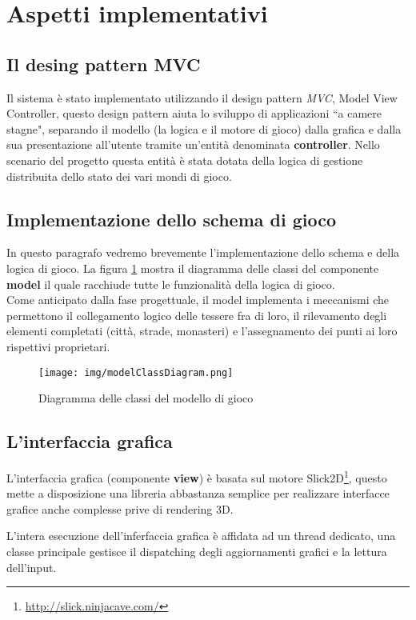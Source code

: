 \section{Aspetti implementativi}



\subsection{Il desing pattern MVC}
Il sistema \`e stato implementato utilizzando il design pattern \emph{MVC},
Model View Controller, questo design pattern aiuta lo sviluppo di applicazioni
``a camere stagne", separando il modello (la logica e il motore di gioco) dalla
grafica e dalla sua presentazione all'utente tramite un'entit\`a denominata
\textbf{controller}. Nello scenario del progetto questa entit\`a \`e stata
dotata della logica di gestione distribuita dello stato dei vari mondi di gioco.

\subsection{Implementazione dello schema di gioco}


In questo paragrafo vedremo brevemente l'implementazione dello schema e
della logica di gioco.
La figura \ref{img:model} mostra il diagramma delle classi del
componente \textbf{model} il quale racchiude tutte le funzionalità della logica
di gioco.\\
Come anticipato dalla fase progettuale, il model implementa i meccanismi che permettono
il collegamento logico delle tessere fra di loro, il rilevamento degli elementi completati
(città, strade, monasteri) e l'assegnamento dei punti ai loro rispettivi
proprietari.
\begin{figure}
\texttt{[image: img/modelClassDiagram.png]}
\caption{Diagramma delle classi del modello di gioco}
\label{img:model}
\end{figure}

\subsection{L'interfaccia grafica}
L'interfaccia grafica (componente \textbf{view}) \`e basata sul motore Slick2D\footnote{\url{http://slick.ninjacave.com/}},  
questo mette a disposizione una libreria abbastanza semplice per realizzare interfacce grafice
anche complesse prive di rendering 3D.

L'intera esecuzione dell'inferfaccia grafica \`e affidata ad un thread dedicato, una
classe principale gestisce il dispatching degli aggiornamenti grafici e la lettura
dell'input.

